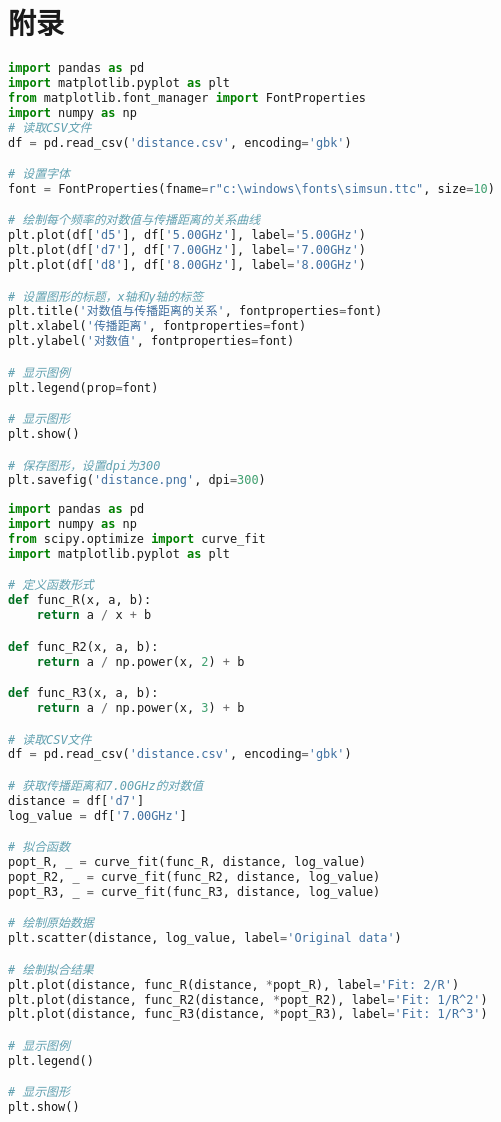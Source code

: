 \documentclass[12pt,hyperref,a4paper,UTF8]{ctexart}
\begin{document}
\appendix
\section{附录}



\begin{lstlisting}[language=Python, caption=代码1]
import pandas as pd
import matplotlib.pyplot as plt
from matplotlib.font_manager import FontProperties
import numpy as np
# 读取CSV文件
df = pd.read_csv('distance.csv', encoding='gbk')

# 设置字体
font = FontProperties(fname=r"c:\windows\fonts\simsun.ttc", size=10)

# 绘制每个频率的对数值与传播距离的关系曲线
plt.plot(df['d5'], df['5.00GHz'], label='5.00GHz')
plt.plot(df['d7'], df['7.00GHz'], label='7.00GHz')
plt.plot(df['d8'], df['8.00GHz'], label='8.00GHz')

# 设置图形的标题，x轴和y轴的标签
plt.title('对数值与传播距离的关系', fontproperties=font)
plt.xlabel('传播距离', fontproperties=font)
plt.ylabel('对数值', fontproperties=font)

# 显示图例
plt.legend(prop=font)

# 显示图形
plt.show()

# 保存图形，设置dpi为300
plt.savefig('distance.png', dpi=300)
\end{lstlisting}

\begin{lstlisting}[language=Python, caption=代码2]
import pandas as pd
import numpy as np
from scipy.optimize import curve_fit
import matplotlib.pyplot as plt

# 定义函数形式
def func_R(x, a, b):
    return a / x + b

def func_R2(x, a, b):
    return a / np.power(x, 2) + b

def func_R3(x, a, b):
    return a / np.power(x, 3) + b

# 读取CSV文件
df = pd.read_csv('distance.csv', encoding='gbk')

# 获取传播距离和7.00GHz的对数值
distance = df['d7']
log_value = df['7.00GHz']

# 拟合函数
popt_R, _ = curve_fit(func_R, distance, log_value)
popt_R2, _ = curve_fit(func_R2, distance, log_value)
popt_R3, _ = curve_fit(func_R3, distance, log_value)

# 绘制原始数据
plt.scatter(distance, log_value, label='Original data')

# 绘制拟合结果
plt.plot(distance, func_R(distance, *popt_R), label='Fit: 2/R')
plt.plot(distance, func_R2(distance, *popt_R2), label='Fit: 1/R^2')
plt.plot(distance, func_R3(distance, *popt_R3), label='Fit: 1/R^3')

# 显示图例
plt.legend()

# 显示图形
plt.show()
\end{lstlisting}
\end{document}
